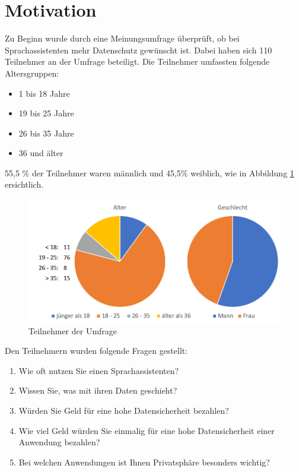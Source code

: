 \section{Motivation}\label{sec:motivaiton}
Zu Beginn wurde durch eine Meinungsumfrage überprüft, ob bei Sprachassistenten mehr Datenschutz gewünscht ist. Dabei haben sich 110 Teilnehmer an der Umfrage beteiligt. Die Teilnehmer umfassten folgende Altersgruppen:
\begin{itemize}
	\item 1 bis 18 Jahre 
	\item 19 bis 25 Jahre
	\item 26 bis 35 Jahre
	\item 36 und älter	
\end{itemize}

55,5 \% der Teilnehmer waren männlich und 45,5\%  weiblich, wie in Abbildung \ref{fig:umfrage_teilnehmer} ersichtlich.

\begin{figure}[!ht]
	\centering
	\includegraphics[width=0.9\linewidth]{Picture/umfrage_teilnehmer}
	\caption[Teilnehmer der Umfrage]{Teilnehmer der Umfrage}
	\label{fig:umfrage_teilnehmer}
	
\end{figure}

Den Teilnehmern wurden folgende Fragen gestellt:

\begin{enumerate}	
	\item Wie oft nutzen Sie einen Sprachassistenten?
	\item Wissen Sie, was mit ihren Daten geschieht?
	\item Würden Sie Geld für eine hohe Datensicherheit bezahlen?
	\item Wie viel Geld würden Sie einmalig für eine hohe Datensicherheit einer Anwendung bezahlen?
	\item Bei welchen Anwendungen ist Ihnen Privatsphäre besonders wichtig?	
\end{enumerate}

